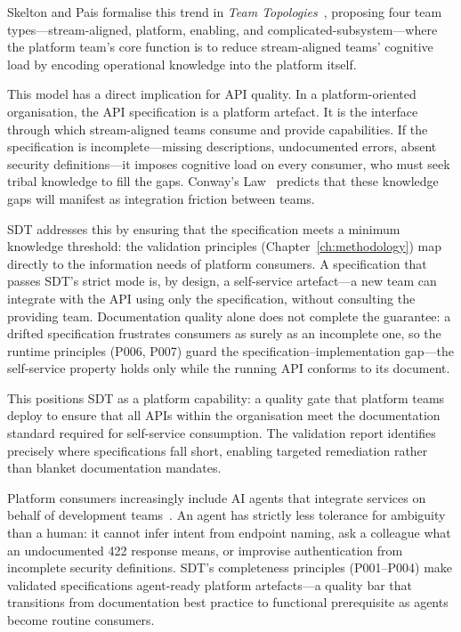 Skelton and Pais formalise this trend in \textit{Team Topologies}~\cite{team-topologies}, proposing four team types---stream-aligned, platform, enabling, and complicated-subsystem---where the platform team's core function is to reduce stream-aligned teams' cognitive load by encoding operational knowledge into the platform itself.

This model has a direct implication for API quality. In a platform-oriented organisation, the API specification is a platform artefact. It is the interface through which stream-aligned teams consume and provide capabilities. If the specification is incomplete---missing descriptions, undocumented errors, absent security definitions---it imposes cognitive load on every consumer, who must seek tribal knowledge to fill the gaps. Conway's Law~\cite{conways-law} predicts that these knowledge gaps will manifest as integration friction between teams.

SDT addresses this by ensuring that the specification meets a minimum knowledge threshold: the validation principles (Chapter~\ref{ch:methodology}) map directly to the information needs of platform consumers. A specification that passes SDT's strict mode is, by design, a self-service artefact---a new team can integrate with the API using only the specification, without consulting the providing team. Documentation quality alone does not complete the guarantee: a drifted specification frustrates consumers as surely as an incomplete one, so the runtime principles (P006, P007) guard the specification--implementation gap---the self-service property holds only while the running API conforms to its document.

This positions SDT as a platform capability: a quality gate that platform teams deploy to ensure that all APIs within the organisation meet the documentation standard required for self-service consumption. The validation report identifies precisely where specifications fall short, enabling targeted remediation rather than blanket documentation mandates.

Platform consumers increasingly include AI agents that integrate services on behalf of development teams~\cite{autonomous-agents-survey}. An agent has strictly less tolerance for ambiguity than a human: it cannot infer intent from endpoint naming, ask a colleague what an undocumented 422 response means, or improvise authentication from incomplete security definitions. SDT's completeness principles (P001--P004) make validated specifications agent-ready platform artefacts---a quality bar that transitions from documentation best practice to functional prerequisite as agents become routine consumers.

